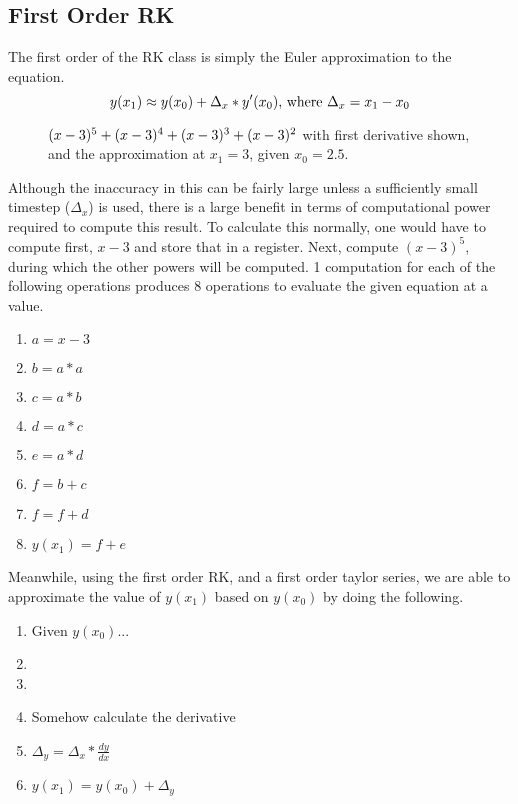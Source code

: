 \documentclass[letterpaper,12pt]{article} %
\begin{document}
\subsection{First Order RK}
The first order of the RK class is simply the Euler approximation to the equation.
\[y(x_1) \approx y(x_0) + \Delta_x * y'(x_0) \text{, where } \Delta_x = x_1 - x_0\]
\begin{figure}[H]
  \centering
\caption{\((x-3)^5 + (x-3)^4 + (x-3)^3 + (x-3)^2\) with first derivative shown, and the approximation at \(x_1 = 3\), given \(x_0 = 2.5\).}
\end{figure}

Although the inaccuracy in this can be fairly large unless a sufficiently small timestep (\(\Delta_x\)) is used, there is a large benefit in terms of computational power required to compute this result.
To calculate this normally, one would have to compute first, \(x-3\) and store that in a register.
Next, compute \((x-3)^5\), during which the other powers will be computed.
1 computation for each of the following operations produces 8 operations to evaluate the given equation at a value.
\begin{enumerate}
  \item \(a = x-3\)
  \item \(b = a*a\)
  \item \(c = a*b\)
  \item \(d = a*c\)
  \item \(e = a*d\)
  \item \(f = b + c\)
  \item \(f = f + d\)
  \item \(y(x_1) = f + e\)
\end{enumerate}

Meanwhile, using the first order RK, and a first order taylor series, we are able to approximate the value of \(y(x_1)\) based on \(y(x_0)\) by doing the following.
\begin{enumerate}
  \item Given \(y(x_0)\)...
  \item {}
  \item {}
  \item Somehow calculate the derivative
  \item \(\Delta_y = \Delta_x * \frac{dy}{dx}\)
  \item \(y(x_1) = y(x_0) + \Delta_y\)
\end{enumerate}
\end{document}

